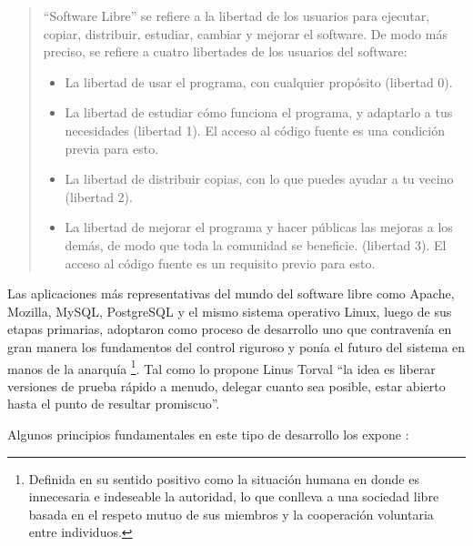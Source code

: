 \begin{quote}
“Software Libre” se refiere a la libertad de los usuarios para ejecutar, copiar, distribuir, estudiar, cambiar y mejorar el software. De modo más preciso, se refiere a cuatro libertades de los usuarios del software:

\begin{itemize}
\item La libertad de usar el programa, con cualquier propósito (libertad 0).
\item La libertad de estudiar cómo funciona el programa, y adaptarlo a tus necesidades (libertad 1). El acceso al código fuente es una condición previa para esto.
\item La libertad de distribuir copias, con lo que puedes ayudar a tu vecino (libertad 2).
\item La libertad de mejorar el programa y hacer públicas las mejoras a los demás, de modo que toda la comunidad se beneficie. (libertad 3). El acceso al código fuente es un requisito previo para esto.
\end{itemize}
\end{quote} 

Las aplicaciones más representativas del mundo del software libre como Apache, Mozilla, MySQL, PostgreSQL y el mismo sistema operativo Linux, luego de sus etapas primarias, adoptaron como proceso de desarrollo uno que contravenía en gran manera los fundamentos del control riguroso y ponía el futuro del sistema en manos de la anarquía \footnote{Definida en su sentido positivo como la situación humana en donde es innecesaria e indeseable la autoridad, lo que conlleva a una sociedad libre basada en el respeto mutuo de sus miembros y la cooperación voluntaria entre individuos.\cite{bce}}. Tal como lo propone Linus Torval “la idea es liberar versiones de prueba rápido a menudo, delegar cuanto sea posible, estar abierto hasta el punto de resultar promiscuo”.

Algunos principios fundamentales en este tipo de desarrollo los expone \cite{raymond}:

